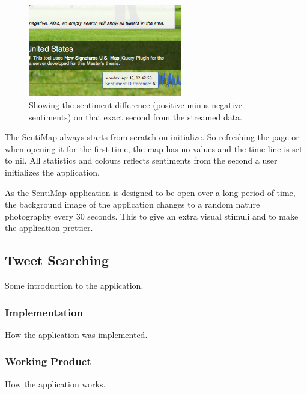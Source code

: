 \begin{figure}[htb!]
\begin{center}
 \includegraphics[width=0.6\textwidth]{../img/sentimap_screenshot_timeline.png}
 \caption[SentiMap timeline screen shot]{Showing the sentiment difference (positive minus negative sentiments) on that exact second from the streamed data.}
 \label{fig:sentimap_screenshot_timeline}
\end{center}
\end{figure}

The SentiMap always starts from scratch on initialize. So refreshing the page or when opening it for the first time, the map has no values and the time line is set to nil. All statistics and colours reflects sentiments from the second a user initializes the application.

As the SentiMap application is designed to be open over a long period of time, the background image of the application changes to a random nature photography every 30 seconds. This to give an extra visual stimuli and to make the application prettier.



\subsection{Tweet Searching}

Some introduction to the application.

\subsubsection{Implementation}

How the application was implemented. 

\subsubsection{Working Product}

How the application works.
